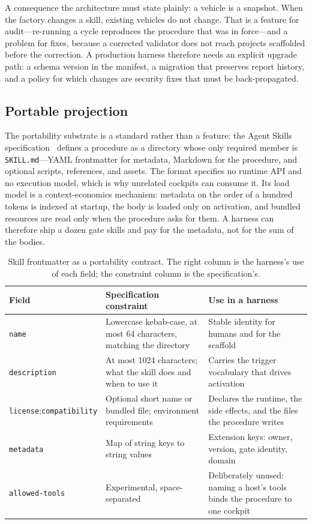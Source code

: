 \documentclass[10pt,a4paper]{article}
\theoremstyle{definition}
\theoremstyle{plain}
\theoremstyle{principle}
\newcommand{\file}[1]{\texttt{#1}}
\newcommand{\code}[1]{\texttt{#1}}
\begin{document}
A consequence the architecture must state plainly: a vehicle is a snapshot. When the factory
changes a skill, existing vehicles do not change. That is a feature for audit---re-running a cycle
reproduces the procedure that was in force---and a problem for fixes, because a corrected validator
does not reach projects scaffolded before the correction. A production harness therefore needs an
explicit upgrade path: a schema version in the manifest, a migration that preserves report history,
and a policy for which changes are security fixes that must be back-propagated.

\subsection{Portable projection}

The portability substrate is a standard rather than a feature: the Agent Skills
specification~\cite{agentskills} defines a procedure as a directory whose only required member is
\file{SKILL.md}---YAML frontmatter for metadata, Markdown for the procedure, and optional scripts,
references, and assets. The format specifies no runtime API and no execution model, which is why
unrelated cockpits can consume it. Its load model is a context-economics mechanism: metadata on
the order of a hundred tokens is indexed at startup, the body is loaded only on activation, and
bundled resources are read only when the procedure asks for them. A harness can therefore ship a
dozen gate skills and pay for the metadata, not for the sum of the bodies.

\begin{table}[htbp]
\centering
\caption{Skill frontmatter as a portability contract. The right column is the harness's use of
each field; the constraint column is the specification's.}
\label{tab:frontmatter}
\small
\begin{tabularx}{\textwidth}{@{}p{2.45cm} >{\raggedright\arraybackslash}p{4.05cm} >{\raggedright\arraybackslash}X@{}}
\toprule
\textbf{Field} & \textbf{Specification constraint} & \textbf{Use in a harness} \\
\midrule
\code{name} & Lowercase kebab-case, at most 64 characters, matching the directory &
Stable identity for humans and for the scaffold \\
\code{description} & At most 1024 characters; what the skill does and when to use it &
Carries the trigger vocabulary that drives activation \\
\code{license};\newline \code{compatibility} & Optional short name or bundled file; environment
requirements & Declares the runtime, the side effects, and the files the procedure writes \\
\code{metadata} & Map of string keys to string values &
Extension keys: owner, version, gate identity, domain \\
\code{allowed-tools} & Experimental, space-separated &
Deliberately unused: naming a host's tools binds the procedure to one cockpit \\
\bottomrule
\end{tabularx}
\end{table}
\end{document}
